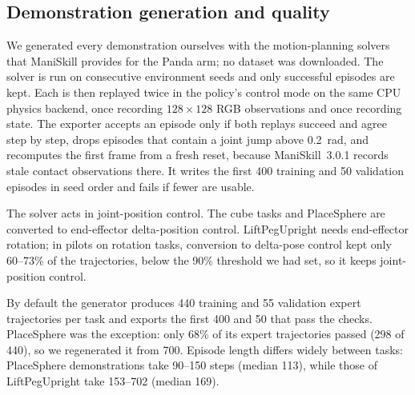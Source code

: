 \subsection{Demonstration generation and quality}
We generated every demonstration ourselves with the motion-planning solvers
that ManiSkill provides for the Panda arm; no dataset was downloaded. The
solver is run on consecutive environment seeds and only successful episodes
are kept. Each is then replayed twice in the policy's control mode on the same
CPU physics backend, once recording $128\times128$ RGB observations and once
recording state. The exporter accepts an episode only if both replays succeed
and agree step by step, drops episodes that contain a joint jump above
0.2~rad, and recomputes the first frame from a fresh reset, because
ManiSkill~3.0.1 records stale contact observations there. It writes the first
400 training and 50 validation episodes in seed order and fails if fewer are
usable.

The solver acts in joint-position control. The cube tasks and PlaceSphere are
converted to end-effector delta-position control. LiftPegUpright needs
end-effector rotation; in pilots on rotation tasks, conversion to delta-pose
control kept only 60--73\% of the trajectories, below the 90\% threshold we
had set, so it keeps joint-position control.

By default the generator produces 440 training and 55 validation expert
trajectories per task and exports the first 400 and 50 that pass the checks.
PlaceSphere was the exception: only 68\% of its expert trajectories passed
(298 of 440), so we regenerated it from 700. Episode length differs widely between tasks:
PlaceSphere demonstrations take 90--150 steps (median 113), while those of
LiftPegUpright take 153--702 (median 169).

